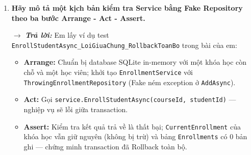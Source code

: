 \begin{enumerate}[label = \arabic*.]
\begin{itemize}[leftmargin = 0.6cm, label = -]
        \item \textbf{Service:} nhận tham số, gọi Repository lấy dữ liệu, xử lý logic (lọc theo chuyên ngành, theo khoảng giá trị) và map sang ViewModel.

        \item \textbf{Repository:} chịu trách nhiệm query database, dùng \texttt{Include} cho Relationship và \\ \texttt{AsNoTracking} vì đây là truy vấn chỉ đọc.

        \item Cách chia này giữ đúng luồng \texttt{Controller $\rightarrow$ Service $\rightarrow$ Repository $\rightarrow$ DbContext} và giúp mỗi tầng dễ test, dễ bảo trì.
    \end{itemize}

    \item \textbf{Hãy mô tả một kịch bản kiểm tra Service bằng Fake Repository theo ba bước Arrange - Act - Assert.}

    $\rightarrow$ \textbf{\textit{Trả lời:}} Em lấy ví dụ test \texttt{EnrollStudentAsync\_LoiGiuaChung\_RollbackToanBo} trong bài của em:
    \begin{itemize}[leftmargin = 0.6cm, label = -]
        \item \textbf{Arrange:} Chuẩn bị database SQLite in-memory với một khóa học còn chỗ và một học viên; khởi tạo \texttt{EnrollmentService} với \texttt{ThrowingEnrollmentRepository} (Fake ném exception ở \texttt{AddAsync}).

        \item \textbf{Act:} Gọi \texttt{service.EnrollStudentAsync(courseId, studentId)} --- nghiệp vụ sẽ lỗi giữa transaction.

        \item \textbf{Assert:} Kiểm tra kết quả trả về là thất bại; \texttt{CurrentEnrollment} của khóa học vẫn giữ nguyên (không bị trừ) và bảng \texttt{Enrollments} có 0 bản ghi --- chứng minh transaction đã Rollback toàn bộ.
    \end{itemize}
\end{enumerate}
